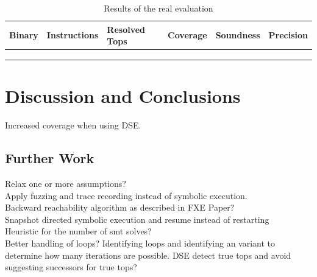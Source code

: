 \documentclass{kththesis}
\begin{document}
\begin{table}[ht]
\centering
\begin{tabular}{|l|l|l|l|l|l|}
\hline
\textbf{Binary} & \textbf{Instructions} & \textbf{Resolved Tops} & \textbf{Coverage} & \textbf{Soundness} & \textbf{Precision} \\ \hline
                &                       &                        &                   &                    &                    \\ \hline
                &                       &                        &                   &                    &                    \\ \hline
                &                       &                        &                   &                    &                    \\ \hline
\end{tabular}
\caption[]{Results of the real evaluation}
\label{tab:jumps}
\end{table}

\chapter{Discussion and Conclusions}\label{chap:discussionAndConclusions}

Increased coverage when using DSE.

\section{Further Work}
Relax one or more assumptions?\\
Apply fuzzing and trace recording instead of symbolic execution.\\
Backward reachability algorithm as described in FXE Paper?\\
Snapshot directed symbolic execution and resume instead of restarting\\
Heuristic for the number of smt solves?\\
Better handling of loops? Identifying loops and identifying an variant to determine how many iterations are possible.
DSE detect true tops and avoid suggesting successors for true tops? 


\begin{otherlanguage}{australian}
\printbibliography[heading=bibintoc]
\end{otherlanguage}



\tailmatter
\end{document}
